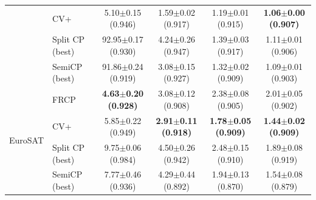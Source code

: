 \begin{table}[t]
\begin{tabular}{llcccc}
 & CV+ & 5.10$\pm$0.15 {\scriptsize(0.946)} & 1.59$\pm$0.02 {\scriptsize(0.917)} & 1.19$\pm$0.01 {\scriptsize(0.915)} & \textbf{1.06$\pm$0.00 {\scriptsize(0.907)}}\\
 & Split CP (best) & 92.95$\pm$0.17 {\scriptsize(0.930)} & 4.24$\pm$0.26 {\scriptsize(0.947)} & 1.39$\pm$0.03 {\scriptsize(0.917)} & 1.11$\pm$0.01 {\scriptsize(0.906)}\\
 & SemiCP (best) & 91.86$\pm$0.24 {\scriptsize(0.919)} & 3.08$\pm$0.15 {\scriptsize(0.927)} & 1.32$\pm$0.02 {\scriptsize(0.909)} & 1.09$\pm$0.01 {\scriptsize(0.903)}\\
\midrule
\multirow{4}{*}{EuroSAT} & FRCP & \textbf{4.63$\pm$0.20 {\scriptsize(0.928)}} & 3.08$\pm$0.12 {\scriptsize(0.908)} & 2.38$\pm$0.08 {\scriptsize(0.905)} & 2.01$\pm$0.05 {\scriptsize(0.902)}\\
 & CV+ & 5.85$\pm$0.22 {\scriptsize(0.949)} & \textbf{2.91$\pm$0.11 {\scriptsize(0.918)}} & \textbf{1.78$\pm$0.05 {\scriptsize(0.909)}} & \textbf{1.44$\pm$0.02 {\scriptsize(0.909)}}\\
 & Split CP (best) & 9.75$\pm$0.06 {\scriptsize(0.984)} & 4.50$\pm$0.26 {\scriptsize(0.942)} & 2.48$\pm$0.15 {\scriptsize(0.910)} & 1.89$\pm$0.08 {\scriptsize(0.919)}\\
 & SemiCP (best) & 7.77$\pm$0.46 {\scriptsize(0.936)} & 4.29$\pm$0.44 {\scriptsize(0.892)} & 1.94$\pm$0.13 {\scriptsize(0.870)} & 1.54$\pm$0.08 {\scriptsize(0.879)}\\
\bottomrule
\end{tabular}
\end{table}
